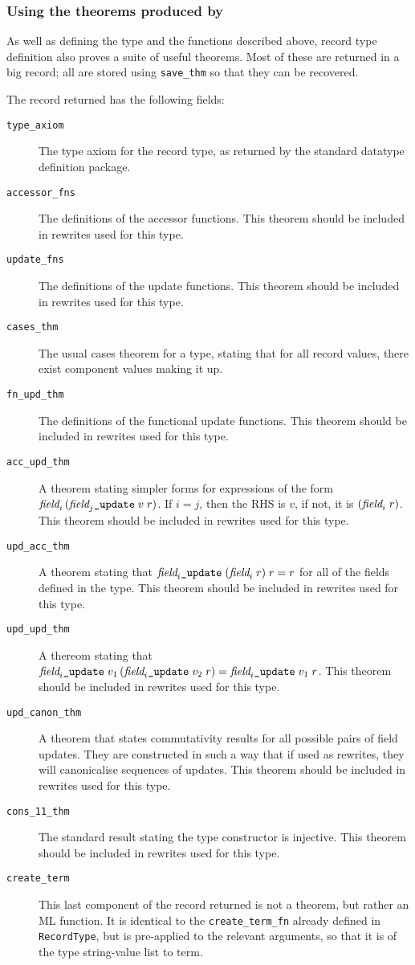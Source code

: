 \documentclass[12pt,fleqn,a4paper]{report}
\begin{document}
\subsubsection{Using the theorems produced by \createrec}

As well as defining the type and the functions described above, record
type definition also proves a suite of useful theorems.  Most of these
are returned in a big record; all are stored using {\tt save\_thm} so
that they can be recovered.

The record returned has the following fields:
\newcommand{\rewruse}{This theorem should be included in rewrites used
  for this type.}
\newcommand{\field}[1]{\mbox{\it field}_{#1}}
\newcommand{\update}{\mbox{\tt\_update}}
\begin{description}
\item[{\tt type\_axiom}] The type axiom for the record type, as
  returned by the standard datatype definition package.
\item[{\tt accessor\_fns}] The definitions of the accessor functions.
  \rewruse
\item[{\tt update\_fns}] The definitions of the update functions.
  \rewruse
\item[{\tt cases\_thm}] The usual cases theorem for a type, stating
  that for all record values, there exist component values making it
  up.
\item[{\tt fn\_upd\_thm}] The definitions of the functional update
  functions.  \rewruse
\item[{\tt acc\_upd\_thm}] A theorem stating simpler forms for
  expressions of the form $\field{i}\, (\field{j}\update\;v\; r)$.  If
  $i = j$, then the RHS is $v$, if not, it is $(\field{i}\;r)$.
  \rewruse
\item[{\tt upd\_acc\_thm}] A theorem stating that $\field{i}\update
  \;(\field{i}\;r)\;r = r$ for all of
  the fields defined in the type. \rewruse
\item[{\tt upd\_upd\_thm}] A thereom stating that $\field{i}\update
  \;v_1 \,(\field{i}\update \;v_2\;r) = \field{i}\update\;v_1\;r$.
  \rewruse
\item[{\tt upd\_canon\_thm}] A theorem that states commutativity results
  for all possible pairs of field updates.  They are constructed in
  such a way that if used as rewrites, they will canonicalise
  sequences of updates. \rewruse
\item[{\tt cons\_11\_thm}] The standard result stating the type
  constructor is injective.  \rewruse
\item[{\tt create\_term}] This last component of the record returned
  is not a theorem, but rather an ML function.  It is identical to the
  {\tt create\_term\_fn} already defined in {\tt RecordType}, but is
  pre-applied to the relevant arguments, so that it is of the type
  string-value list to term.
\end{description}
\end{document}
